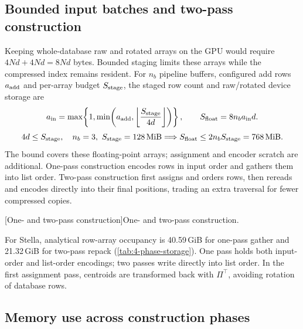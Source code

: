 \subsection{Bounded input batches and two-pass construction}

Keeping whole-database raw and rotated arrays on the GPU would require
$4Nd+4Nd=8Nd$ bytes. Bounded staging limits these arrays while the
compressed index remains resident. For $n_b$ pipeline buffers,
configured add rows $a_{\rm add}$ and per-array budget $S_{\rm stage}$,
the staged row count and raw/rotated device storage are
\begin{equation}
 a_{\rm in}=\max\!\left\{1,\min\!\left(a_{\rm add},
 \left\lfloor\frac{S_{\rm stage}}{4d}\right\rfloor\right)\right\},
 \qquad S_{\rm float}=8n_ba_{\rm in}d.
 \label{eq:4-staging-rows}
\end{equation}
\[
 4d\leq S_{\rm stage},\quad n_b=3,\ S_{\rm stage}=128\,\mathrm{MiB}
 \Longrightarrow S_{\rm float}\leq2n_bS_{\rm stage}=768\,\mathrm{MiB}.
\]
The bound covers these floating-point arrays; assignment and encoder
scratch are additional. One-pass construction encodes rows in input
order and gathers them into list order. Two-pass construction first
assigns and orders rows, then rereads and encodes directly into their
final positions, trading an extra traversal for fewer compressed copies.

\par\medskip\noindent\begin{minipage}{\linewidth}
\captionsetup{hypcap=false}
\centering

[One- and two-pass construction]{One- and two-pass construction.}
\label{fig:2-add-paths}
\end{minipage}\par\medskip

For Stella, analytical row-array occupancy is 40.59\,GiB for one-pass gather and 21.32\,GiB for two-pass repack (\cref{tab:4-phase-storage}). One pass holds both input-order and list-order encodings; two passes write directly into list order. In the first assignment pass, centroids are transformed back with $\Pi^\top$, avoiding rotation of database rows.

\subsection{Memory use across construction phases}

